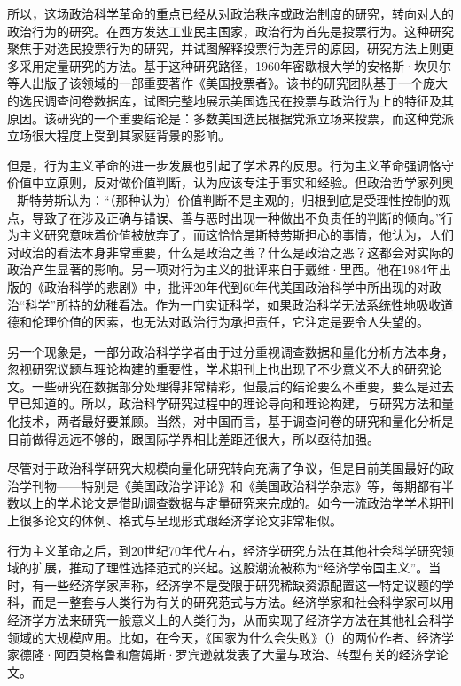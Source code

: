 所以，这场政治科学革命的重点已经从对政治秩序或政治制度的研究，转向对人的政治行为的研究。在西方发达工业民主国家，政治行为首先是投票行为。这种研究聚焦于对选民投票行为的研究，并试图解释投票行为差异的原因，研究方法上则更多采用定量研究的方法。基于这种研究路径，1960年密歇根大学的安格斯·坎贝尔等人出版了该领域的一部重要著作《美国投票者》。该书的研究团队基于一个庞大的选民调查问卷数据库，试图完整地展示美国选民在投票与政治行为上的特征及其原因。该研究的一个重要结论是：多数美国选民根据党派立场来投票，而这种党派立场很大程度上受到其家庭背景的影响。

但是，行为主义革命的进一步发展也引起了学术界的反思。行为主义革命强调恪守价值中立原则，反对做价值判断，认为应该专注于事实和经验。但政治哲学家列奥·斯特劳斯认为：“（那种认为）价值判断不是主观的，归根到底是受理性控制的观点，导致了在涉及正确与错误、善与恶时出现一种做出不负责任的判断的倾向。”行为主义研究意味着价值被放弃了，而这恰恰是斯特劳斯担心的事情，他认为，人们对政治的看法本身非常重要，什么是政治之善？什么是政治之恶？这都会对实际的政治产生显著的影响。另一项对行为主义的批评来自于戴维·里西。他在1984年出版的《政治科学的悲剧》中，批评20年代到60年代美国政治科学中所出现的对政治“科学”所持的幼稚看法。作为一门实证科学，如果政治科学无法系统性地吸收道德和伦理价值的因素，也无法对政治行为承担责任，它注定是要令人失望的。

另一个现象是，一部分政治科学学者由于过分重视调查数据和量化分析方法本身，忽视研究议题与理论构建的重要性，学术期刊上也出现了不少意义不大的研究论文。一些研究在数据部分处理得非常精彩，但最后的结论要么不重要，要么是过去早已知道的。所以，政治科学研究过程中的理论导向和理论构建，与研究方法和量化技术，两者最好要兼顾。当然，对中国而言，基于调查问卷的研究和量化分析是目前做得远远不够的，跟国际学界相比差距还很大，所以亟待加强。

尽管对于政治科学研究大规模向量化研究转向充满了争议，但是目前美国最好的政治学刊物——特别是《美国政治学评论》和《美国政治科学杂志》等，每期都有半数以上的学术论文是借助调查数据与定量研究来完成的。如今一流政治学学术期刊上很多论文的体例、格式与呈现形式跟经济学论文非常相似。

行为主义革命之后，到20世纪70年代左右，经济学研究方法在其他社会科学研究领域的扩展，推动了理性选择范式的兴起。这股潮流被称为“经济学帝国主义”。当时，有一些经济学家声称，经济学不是受限于研究稀缺资源配置这一特定议题的学科，而是一整套与人类行为有关的研究范式与方法。经济学家和社会科学家可以用经济学方法来研究一般意义上的人类行为，从而实现了经济学方法在其他社会科学领域的大规模应用。比如，在今天，《国家为什么会失败》（）的两位作者、经济学家德隆·阿西莫格鲁和詹姆斯·罗宾逊就发表了大量与政治、转型有关的经济学论文。

